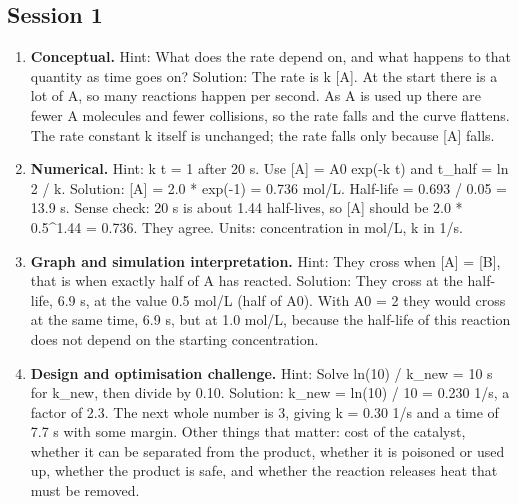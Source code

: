 \documentclass[11pt,a4paper]{article}
\begin{document}
\subsection*{Session 1}
\begin{enumerate}[nosep]
\item \textbf{Conceptual.} Hint: What does the rate depend on, and what happens to that quantity as time goes on? Solution: The rate is k [A]. At the start there is a lot of A, so many reactions happen per second. As A is used up there are fewer A molecules and fewer collisions, so the rate falls and the curve flattens. The rate constant k itself is unchanged; the rate falls only because [A] falls.
\item \textbf{Numerical.} Hint: k t = 1 after 20 s. Use [A] = A0 exp(-k t) and t\_half = ln 2 / k. Solution: [A] = 2.0 * exp(-1) = 0.736 mol/L. Half-life = 0.693 / 0.05 = 13.9 s. Sense check: 20 s is about 1.44 half-lives, so [A] should be 2.0 * 0.5\textasciicircum{}1.44 = 0.736. They agree. Units: concentration in mol/L, k in 1/s.
\item \textbf{Graph and simulation interpretation.} Hint: They cross when [A] = [B], that is when exactly half of A has reacted. Solution: They cross at the half-life, 6.9 s, at the value 0.5 mol/L (half of A0). With A0 = 2 they would cross at the same time, 6.9 s, but at 1.0 mol/L, because the half-life of this reaction does not depend on the starting concentration.
\item \textbf{Design and optimisation challenge.} Hint: Solve ln(10) / k\_new = 10 s for k\_new, then divide by 0.10. Solution: k\_new = ln(10) / 10 = 0.230 1/s, a factor of 2.3. The next whole number is 3, giving k = 0.30 1/s and a time of 7.7 s with some margin. Other things that matter: cost of the catalyst, whether it can be separated from the product, whether it is poisoned or used up, whether the product is safe, and whether the reaction releases heat that must be removed.
\end{enumerate}
\end{document}
